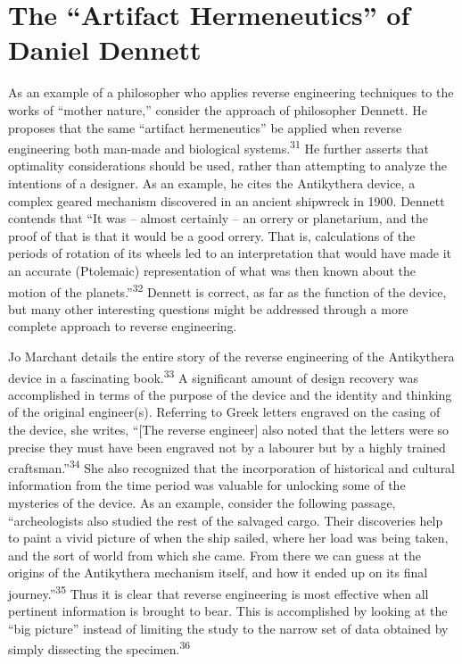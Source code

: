 \section{The “Artifact Hermeneutics” of Daniel Dennett}

As an example of a philosopher who applies reverse engineering
techniques to the works of “mother nature,” consider the approach of
philosopher Dennett. He proposes that the same “artifact hermeneutics”
be applied when reverse engineering both man-made and biological
systems.\textsuperscript{31} He further asserts that optimality
considerations should be used, rather than attempting to analyze the
intentions of a designer. As an example, he cites the Antikythera
device, a complex geared mechanism discovered in an ancient shipwreck
in 1900. Dennett contends that “It was – almost certainly – an orrery
or planetarium, and the proof of that is that it would be a good
orrery. That is, calculations of the periods of rotation of its wheels
led to an interpretation that would have made it an accurate
(Ptolemaic) representation of what was then known about the motion of
the planets.”\textsuperscript{32} Dennett is correct, as far as the
function of the device, but many other interesting questions might be
addressed through a more complete approach to reverse engineering.


Jo Marchant details the entire story of the reverse engineering of the
Antikythera device in a fascinating book.\textsuperscript{33} A
significant amount of design recovery was accomplished in terms of the
purpose of the device and the identity and thinking of the original
engineer(s). Referring to Greek letters engraved on the casing of the
device, she writes, “[The reverse engineer] also noted that the letters
were so precise they must have been engraved not by a labourer but by a
highly trained craftsman.”\textsuperscript{34} She also recognized that
the incorporation of historical and cultural information from the time
period was valuable for unlocking some of the mysteries of the device.
As an example, consider the following passage, “archeologists also
studied the rest of the salvaged cargo. Their discoveries help to paint
a vivid picture of when the ship sailed, where her load was being
taken, and the sort of world from which she came. From there we can
guess at the origins of the Antikythera mechanism itself, and how it
ended up on its final journey.”\textsuperscript{35} Thus it is clear
that reverse engineering is most effective when all pertinent
information is brought to bear. This is accomplished by looking at the
“big picture” instead of limiting the study to the narrow set of data
obtained by simply dissecting the specimen.\textsuperscript{36}



